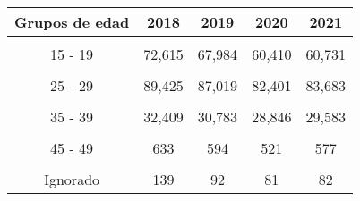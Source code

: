 \begin{tabular}[t]{ccccc}
\toprule
\textbf{Grupos de edad} & \textbf{2018} & \textbf{2019} & \textbf{2020} & \textbf{2021}\\
\midrule
\cellcolor[HTML]{B6B3FF}{Menos de 15} & \cellcolor[HTML]{B6B3FF}{2,004} & \cellcolor[HTML]{B6B3FF}{1,914} & \cellcolor[HTML]{B6B3FF}{1,578} & \cellcolor[HTML]{B6B3FF}{1,805}\\
15 - 19 & 72,615 & 67,984 & 60,410 & 60,731\\
\cellcolor[HTML]{B6B3FF}{20 - 24} & \cellcolor[HTML]{B6B3FF}{117,125} & \cellcolor[HTML]{B6B3FF}{112,059} & \cellcolor[HTML]{B6B3FF}{105,610} & \cellcolor[HTML]{B6B3FF}{105,003}\\
25 - 29 & 89,425 & 87,019 & 82,401 & 83,683\\
\cellcolor[HTML]{B6B3FF}{30 - 34} & \cellcolor[HTML]{B6B3FF}{59,125} & \cellcolor[HTML]{B6B3FF}{57,213} & \cellcolor[HTML]{B6B3FF}{53,221} & \cellcolor[HTML]{B6B3FF}{54,809}\\
35 - 39 & 32,409 & 30,783 & 28,846 & 29,583\\
\cellcolor[HTML]{B6B3FF}{40 - 44} & \cellcolor[HTML]{B6B3FF}{9,744} & \cellcolor[HTML]{B6B3FF}{9,161} & \cellcolor[HTML]{B6B3FF}{8,513} & \cellcolor[HTML]{B6B3FF}{8,840}\\
45 - 49 & 633 & 594 & 521 & 577\\
\cellcolor[HTML]{B6B3FF}{50 y más} & \cellcolor[HTML]{B6B3FF}{44} & \cellcolor[HTML]{B6B3FF}{36} & \cellcolor[HTML]{B6B3FF}{31} & \cellcolor[HTML]{B6B3FF}{36}\\
Ignorado & 139 & 92 & 81 & 82\\
\bottomrule
\end{tabular}
